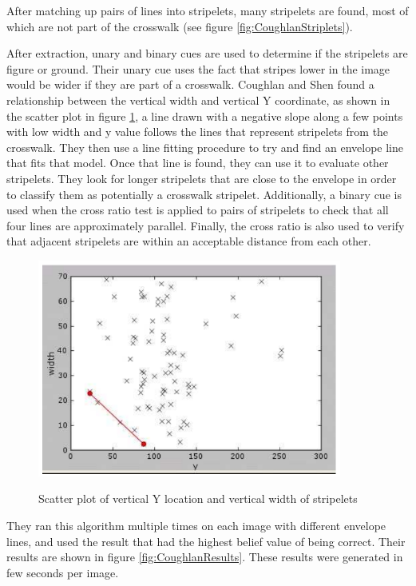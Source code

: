 \documentclass[12pt]{ucthesis}
\newcommand{\captionfonts}{\small\bf\ssp}
\begin{document}
After matching up pairs of lines into stripelets, many stripelets are found, most of which are not part of the crosswalk (see figure \ref{fig:CoughlanStriplets}).

After extraction, unary and binary cues are used to determine if the stripelets are figure or ground. Their unary cue uses the fact that stripes lower in the image would be wider if they are part of a crosswalk. Coughlan and Shen found a relationship between the vertical width and vertical Y coordinate, as shown in the scatter plot in figure \ref{fig:CoughlanScatter}, a line drawn with a negative slope along a few points with low width and y value follows the lines that represent stripelets from the crosswalk. They then use a line fitting procedure to try and find an envelope line that fits that model. Once that line is found, they can use it to evaluate other stripelets. They look for longer stripelets that are close to the envelope in order to classify them as potentially a crosswalk stripelet. Additionally, a binary cue is used when the cross ratio test is applied to pairs of stripelets to check that all four lines are approximately parallel. Finally, the cross ratio is also used to verify that adjacent stripelets are within an acceptable distance from each other. 

\begin{figure}[t]
\begin{center}
\includegraphics[width=10cm]{CoughlanScatter.png}
\captionfonts
\caption[Coughlan Scatterplot of Y and Vertical Width]{Scatter plot of vertical Y location and vertical width of stripelets \cite{Coughlan2006}}
\label{fig:CoughlanScatter}
\end{center}
\end{figure}

They ran this algorithm multiple times on each image with different envelope lines, and used the result that had the highest belief value of being correct. Their results are shown in figure \ref{fig:CoughlanResults}. These results were generated in few seconds per image. 
\end{document}

